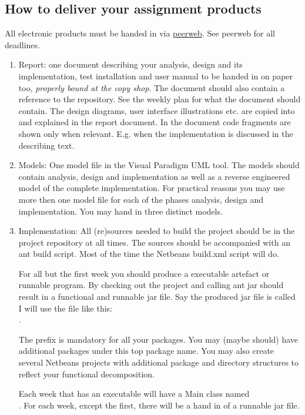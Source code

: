 \subsection{How to deliver your assignment products}
All electronic products must be handed in via \href{https://www.fontysvenlo.org/peerweb}{peerweb}. See peerweb for all deadlines.
\begin{enumerate}
\item Report: one document describing your analysis, design and its
  implementation, test installation and user manual to be handed in on
  paper too, \emph{properly bound at the copy shop}. The document should also
  contain a reference to the repository. 
  See the weekly plan for what the document should contain. The
  design diagrams, user interface illustrations etc. are copied into
  and explained in the report document. In the document code fragments
  are shown only when relevant. E.g.  when the implementation is
  discussed in the describing text.
\item  Models: One model file in the Visual Paradigm UML tool.
  The models should contain analysis, design and implementation as
  well as a reverse engineered model of the complete
  implementation. For practical reasons you may use more then one
  model file for each of the phases analysis, design and
  implementation. You may hand in three distinct models.
\item Implementation: All (re)sources needed to build the project
  should be in the project repository at all times. The sources should
  be accompanied with an ant build script. Most of the time the
  Netbeans build.xml script will do.
  
  For all but the first week you should produce a executable artefact
  or runnable program. 
  By checking out the project and calling ant jar should result in a
  functional and runnable jar file. Say the produced jar file is
  called 
  I will use the file like this:\\
  .
  
  The prefix  is mandatory for all your
  packages. You may (maybe should) have additional packages under this
  top package name. You may also create several Netbeans projects with
  additional package and directory structures to reflect your
  functional decomposition.
  
  Each week that has an executable will have a Main class named\\
  . For each
  week, except the first, there will be a hand in of a runnable jar file.
\end{enumerate}

